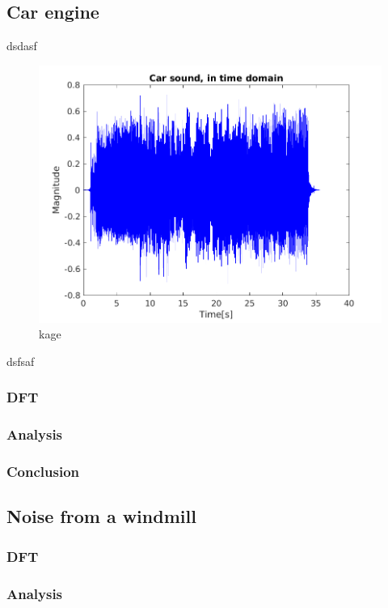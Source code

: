 \subsection{Car engine}
dsdasf
\begin{figure}[H]
	\includegraphics[width=\textwidth]{code/Car_figure1.png}
	\caption{kage}
\end{figure}
dsfsaf

\subsubsection{DFT}

\subsubsection{Analysis}

\subsubsection{Conclusion}

\subsection{Noise from a windmill}
\subsubsection{DFT}

\subsubsection{Analysis}

